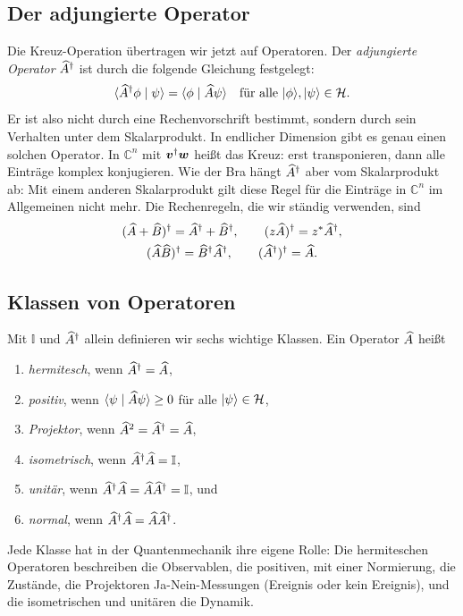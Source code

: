 \subsection{Der adjungierte Operator}
Die Kreuz-Operation übertragen wir jetzt auf Operatoren. Der \emph{adjungierte Operator} $\widehat{A}^{\dagger}$ ist durch die folgende Gleichung festgelegt:
\begin{equation}
	\langle \widehat{A}^{\dagger}\phi \mid \psi \rangle = \langle \phi \mid \widehat{A}\psi \rangle \quad \text{für alle } \lvert \phi \rangle,\lvert \psi \rangle\in\mathcal{H}.
\end{equation}
Er ist also nicht durch eine Rechenvorschrift bestimmt, sondern durch sein Verhalten unter dem Skalarprodukt. In endlicher Dimension gibt es genau einen solchen Operator. In $\mathbb{C}^n$ mit $\boldsymbol{v}^{\dagger}\boldsymbol{w}$ heißt das Kreuz: erst transponieren, dann alle Einträge komplex konjugieren. Wie der Bra hängt $\widehat{A}^{\dagger}$ aber vom Skalarprodukt ab: Mit einem anderen Skalarprodukt gilt diese Regel für die Einträge in $\mathbb{C}^n$ im Allgemeinen nicht mehr. Die Rechenregeln, die wir ständig verwenden, sind
\begin{equation}
	\begin{gathered}
		(\widehat{A} + \widehat{B})^{\dagger} = \widehat{A}^{\dagger} + \widehat{B}^{\dagger}, \qquad (z\widehat{A})^{\dagger} = z^*\widehat{A}^{\dagger}, \\
		(\widehat{A}\widehat{B})^{\dagger} = \widehat{B}^{\dagger}\widehat{A}^{\dagger}, \qquad (\widehat{A}^{\dagger})^{\dagger} = \widehat{A}.
	\end{gathered}
\end{equation}

\subsection{Klassen von Operatoren}
Mit $\mathbb{I}$ und $\widehat{A}^{\dagger}$ allein definieren wir sechs wichtige Klassen. Ein Operator $\widehat{A}$ heißt
\begin{enumerate}
	\item \emph{hermitesch}, wenn $\widehat{A}^{\dagger} = \widehat{A}$,
	\item \emph{positiv}, wenn $\langle \psi \mid \widehat{A}\psi \rangle \geq 0$ für alle $\lvert \psi \rangle\in\mathcal{H}$,
	\item \emph{Projektor}, wenn $\widehat{A}^2 = \widehat{A}^{\dagger} = \widehat{A}$,
	\item \emph{isometrisch}, wenn $\widehat{A}^{\dagger}\widehat{A} = \mathbb{I}$,
	\item \emph{unitär}, wenn $\widehat{A}^{\dagger}\widehat{A} = \widehat{A}\widehat{A}^{\dagger} = \mathbb{I}$, und
	\item \emph{normal}, wenn $\widehat{A}^{\dagger}\widehat{A} = \widehat{A}\widehat{A}^{\dagger}$.
\end{enumerate}
Jede Klasse hat in der Quantenmechanik ihre eigene Rolle: Die hermiteschen Operatoren beschreiben die Observablen, die positiven, mit einer Normierung, die Zustände, die Projektoren Ja-Nein-Messungen (Ereignis oder kein Ereignis), und die isometrischen und unitären die Dynamik.

